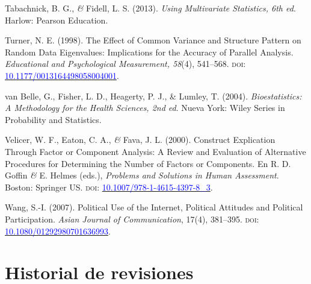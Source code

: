 \documentclass[a4paper]{tufte-handout}
\begin{document}
\begin{list}{}
\item{\small Tabachnick, B. G., {\itshape \&} Fidell, L. S. (2013). {\itshape Using Multivariate Statistics, 6th ed}. Harlow: Pearson Education.}

\item{\small Turner, N. E. (1998). The Effect of Common Variance and Structure Pattern on Random Data Eigenvalues: Implications for the Accuracy of Parallel Analysis. {\itshape Educational and Psychological Measurement, 58}(4), 541--568. {\scshape doi:} \href{https://doi.org/10.1177/0013164498058004001}{\textcolor{blue}{10.1177/0013164498058004001}}.}

\item{\small van Belle, G., Fisher, L. D., Heagerty, P. J., \& Lumley, T. (2004). {\itshape Bioestatistics: A Methodology for the Health Sciences, 2nd ed}. Nueva York: Wiley Series in Probability and Statistics.}

\item{\small Velicer, W. F., Eaton, C. A., {\itshape \&} Fava, J. L. (2000). Construct Explication Through Factor or Component Analysis: A Review and Evaluation of Alternative Procedures for Determining the Number of Factors or Components. En R. D. Goffin {\itshape \&} E. Helmes (eds.), {\itshape Problems and Solutions in Human Assessment}. Boston: Springer US. {\scshape doi:} \href{https://doi.org/10.1007/978-1-4615-4397-8_3}{\textcolor{blue}{10.1007/978-1-4615-4397-8\_3}}.}

\item{\small Wang, S.-I. (2007). Political Use of the Internet, Political Attitudes and Political Participation. {\itshape Asian Journal of Communication}, 17(4), 381--395. {\scshape doi:} \href{https://doi.org/10.1080/01292980701636993}{\textcolor{blue}{10.1080/01292980701636993}}.}

\end{list}


\section{{\normalfont Historial de revisiones}}

\end{document}
